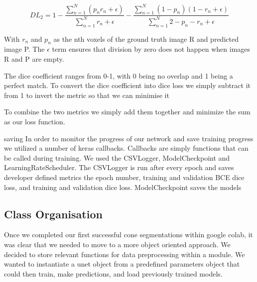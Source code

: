 \documentclass[12pt]{article}
\begin{document}
\begin{equation}
DL_{2} = 1 - \frac{\sum_{n=1}^{N} (p_{n}r_{n} + \epsilon) }{\sum_{n=1}^{N} r_{n} + \epsilon} - \frac{\sum_{n=1}^{N} (1-p_{n})(1-r_{n} + \epsilon)}{\sum_{n=1}^{N} 2-p_{n}-r_{n} + \epsilon}
\end{equation}

With $r_{n}$ and $p_{n}$ as the nth voxels of the ground truth image R and predicted image P. The $\epsilon$ term ensures that division by zero does not happen when images R and P are empty.


The dice coefficient ranges from 0-1, with 0 being no overlap and 1 being a perfect match.
To convert the dice coefficient into dice loss we simply subtract it from 1 to invert the metric so that we can minimise it

To combine the two metrics we simply add them together and minimize the sum as our loss function.

saving
In order to monitor the progress of our network and save training progress we utilized a number of keras callbacks.
Callbacks are simply functions that can be called during training.
We used the CSVLogger, ModelCheckpoint and LearningRateScheduler.
The CSVLogger is run after every epoch and saves developer defined metrics the epoch number, training and validation BCE dice loss, and training and validation dice loss.
ModelCheckpoint saves the models

\subsection{Class Organisation}
Once we completed our first successful cone segmentations within google colab, it was clear that we needed to move to a more object oriented approach.
We decided to  store relevant functions for data preprocessing within a module. 
We wanted to instantiate a unet object from a predefined parameters object that could then train, make predictions, and load previously trained models.
\end{document}
